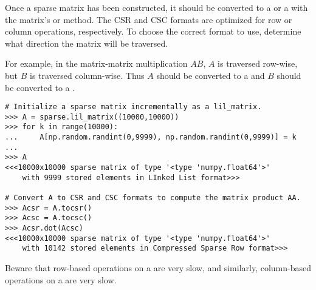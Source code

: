 Once a sparse matrix has been constructed, it should be converted to a  or a  with the matrix's  or  method.
The CSR and CSC formats are optimized for row or column operations, respectively.
To choose the correct format to use, determine what direction the matrix will be traversed.%

For example, in the matrix-matrix multiplication $AB$, $A$ is traversed row-wise, but $B$ is traversed column-wise.
Thus $A$ should be converted to a  and $B$ should be converted to a .

\begin{lstlisting}
# Initialize a sparse matrix incrementally as a lil_matrix.
>>> A = sparse.lil_matrix((10000,10000))
>>> for k in range(10000):
...     A[np.random.randint(0,9999), np.random.randint(0,9999)] = k
...
>>> A
<<<10000x10000 sparse matrix of type '<type 'numpy.float64'>'
    with 9999 stored elements in LInked List format>>>

# Convert A to CSR and CSC formats to compute the matrix product AA.
>>> Acsr = A.tocsr()
>>> Acsc = A.tocsc()
>>> Acsr.dot(Acsc)
<<<10000x10000 sparse matrix of type '<type 'numpy.float64'>'
    with 10142 stored elements in Compressed Sparse Row format>>>
\end{lstlisting}

Beware that row-based operations on a  are very slow, and similarly, column-based operations on a  are very slow.


